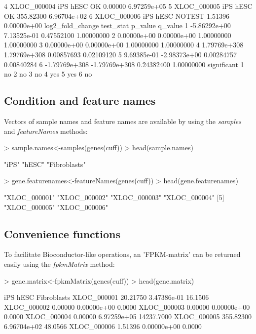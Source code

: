 \documentclass[10pt]{article}
\newcommand{\Rmethod}[1]{{\textit{#1}}}
\begin{document}
\begin{Schunk}
\begin{Soutput}
4 XLOC_000004      iPS     hESC     OK   0.00000 6.97259e+05
5 XLOC_000005      iPS     hESC     OK 355.82300 6.96704e+02
6 XLOC_000006      iPS     hESC NOTEST   1.51396 0.00000e+00
  log2_fold_change     test_stat    p_value    q_value
1     -5.86292e+00   7.13525e-01 0.47552100 1.00000000
2      0.00000e+00   0.00000e+00 1.00000000 1.00000000
3      0.00000e+00   0.00000e+00 1.00000000 1.00000000
4     1.79769e+308  1.79769e+308 0.00857693 0.02109120
5      9.69385e-01  -2.98373e+00 0.00284757 0.00840284
6    -1.79769e+308 -1.79769e+308 0.24382400 1.00000000
  significant
1          no
2          no
3          no
4         yes
5         yes
6          no
\end{Soutput}
\end{Schunk}

\subsection*{Condition and feature names}
Vectors of sample names and feature names are available by using the \Rmethod{samples} and \Rmethod{featureNames} methods:

\begin{Schunk}
\begin{Sinput}
> sample.names<-samples(genes(cuff))
> head(sample.names)
\end{Sinput}
\begin{Soutput}
[1] "iPS"         "hESC"        "Fibroblasts"
\end{Soutput}
\begin{Sinput}
> gene.featurenames<-featureNames(genes(cuff))
> head(gene.featurenames)
\end{Sinput}
\begin{Soutput}
[1] "XLOC_000001" "XLOC_000002" "XLOC_000003" "XLOC_000004"
[5] "XLOC_000005" "XLOC_000006"
\end{Soutput}
\end{Schunk}

\subsection*{Convenience functions}
To facilitate Bioconductor-like operations, an 'FPKM-matrix' can be returned easily using the \Rmethod{fpkmMatrix} method:
\begin{Schunk}
\begin{Sinput}
> gene.matrix<-fpkmMatrix(genes(cuff))
> head(gene.matrix)
\end{Sinput}
\begin{Soutput}
                  iPS        hESC Fibroblasts
XLOC_000001  20.21750 3.47386e-01     16.1506
XLOC_000002   0.00000 0.00000e+00      0.0000
XLOC_000003   0.00000 0.00000e+00      0.0000
XLOC_000004   0.00000 6.97259e+05  14237.7000
XLOC_000005 355.82300 6.96704e+02     48.0566
XLOC_000006   1.51396 0.00000e+00      0.0000
\end{Soutput}
\end{Schunk}
\end{document}
